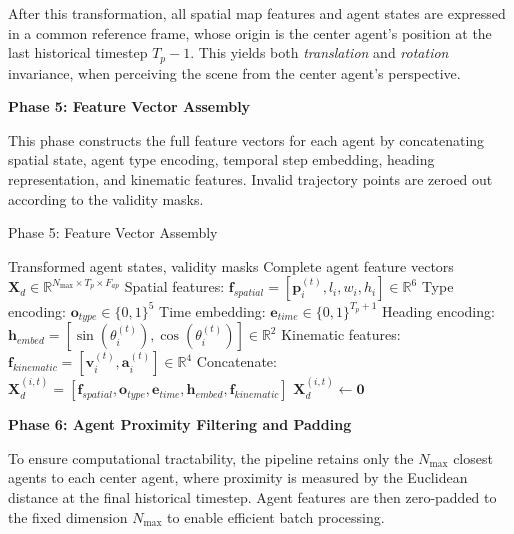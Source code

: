 After this transformation, all spatial map features and agent states are expressed in a common reference frame, whose origin is the center agent's position at the last historical timestep \(T_p-1\). This yields both \emph{translation} and \emph{rotation} invariance, when perceiving the scene from the center agent's perspective.

\textbf{Phase 5: Feature Vector Assembly}

This phase constructs the full feature vectors for each agent by concatenating spatial state, agent type encoding, temporal step embedding, heading representation, and kinematic features. Invalid trajectory points are zeroed out according to the validity masks.

\begin{algorithm}[H]
\caption{Phase 5: Feature Vector Assembly}
\label{alg:phase5_features}
\begin{algorithmic}[1]
\REQUIRE Transformed agent states, validity masks
\ENSURE Complete agent feature vectors \(\boldsymbol{X}_d \in \mathbb{R}^{N_{\max} \times T_p \times F_{ap}}\)
    \STATE Spatial features: \(\boldsymbol{f}_{spatial} = [\boldsymbol{p}_i^{(t)}, l_i, w_i, h_i] \in \mathbb{R}^6\)
    \STATE Type encoding: \(\boldsymbol{o}_{type} \in \{0,1\}^5\)
    \STATE Time embedding: \(\boldsymbol{e}_{time} \in \{0,1\}^{T_p+1}\)
    \STATE Heading encoding: \(\boldsymbol{h}_{embed} = [\sin(\theta_i^{(t)}), \cos(\theta_i^{(t)})] \in \mathbb{R}^2\)
    \STATE Kinematic features: \(\boldsymbol{f}_{kinematic} = [\boldsymbol{v}_i^{(t)}, \boldsymbol{a}_i^{(t)}] \in \mathbb{R}^4\)
    \STATE Concatenate: \(\boldsymbol{X}_d^{(i,t)} = [\boldsymbol{f}_{spatial}, \boldsymbol{o}_{type}, \boldsymbol{e}_{time}, \boldsymbol{h}_{embed}, \boldsymbol{f}_{kinematic}]\)
        \STATE \(\boldsymbol{X}_d^{(i,t)} \leftarrow \boldsymbol{0}\)
    \ENDIF
\ENDFOR
\end{algorithmic}
\end{algorithm}

\textbf{Phase 6: Agent Proximity Filtering and Padding}

To ensure computational tractability, the pipeline retains only the \(N_{\max}\) closest agents to each center agent, where proximity is measured by the Euclidean distance at the final historical timestep. Agent features are then zero-padded to the fixed dimension \(N_{\max}\) to enable efficient batch processing.

